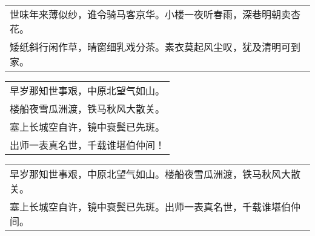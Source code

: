 \nopagebreak%
\nopagebreak%
\noindent\begin{minipage}{\linewidth}
  \vskip-3pt\begin{table}[H]
    \centering
    \begin{tabular}{@{}l@{}}
世味年来薄似纱，谁令骑马客京华。小楼一夜听春雨，深巷明朝卖杏花。\\
矮纸斜行闲作草，晴窗细乳戏分茶。素衣莫起风尘叹，犹及清明可到家。
    \end{tabular}
  \end{table}
\end{minipage}
\vspace{1cm}


\nopagebreak%
\nopagebreak%
\noindent\begin{minipage}{\linewidth}
  \vskip-3pt\begin{table}[H]
    \centering
    \begin{tabular}{@{}l@{}}
早岁那知世事艰，中原北望气如山。\\
楼船夜雪瓜洲渡，铁马秋风大散关。\\
塞上长城空自许，镜中衰鬓已先斑。\\
出师一表真名世，千载谁堪伯仲间！
    \end{tabular}
  \end{table}
\end{minipage}
\vspace{1cm}


\nopagebreak%
\nopagebreak%
\noindent\begin{minipage}{\linewidth}
  \vskip-3pt\begin{table}[H]
    \centering
    \begin{tabular}{@{}l@{}}
早岁那知世事艰，中原北望气如山。楼船夜雪瓜洲渡，铁马秋风大散关。\\
塞上长城空自许，镜中衰鬓已先斑。出师一表真名世，千载谁堪伯仲间。
    \end{tabular}
  \end{table}
\end{minipage}
\vspace{1cm}


